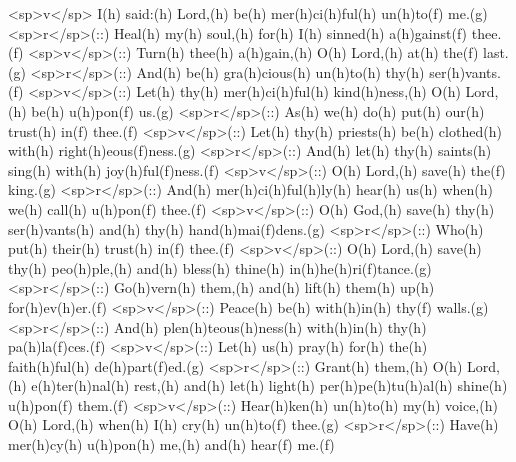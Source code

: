 <sp>v</sp> I(h) said:(h) Lord,(h) be(h) mer(h)ci(h)ful(h) un(h)to(f) me.(g)
<sp>r</sp>(::) Heal(h) my(h) soul,(h) for(h) I(h) sinned(h) a(h)gainst(f) thee.(f)
<sp>v</sp>(::) Turn(h) thee(h) a(h)gain,(h) O(h) Lord,(h) at(h) the(f) last.(g)
<sp>r</sp>(::) And(h) be(h) gra(h)cious(h) un(h)to(h) thy(h) ser(h)vants.(f)
<sp>v</sp>(::) Let(h) thy(h) mer(h)ci(h)ful(h) kind(h)ness,(h) O(h) Lord,(h) be(h) u(h)pon(f) us.(g)
<sp>r</sp>(::) As(h) we(h) do(h) put(h) our(h) trust(h) in(f) thee.(f)
<sp>v</sp>(::) Let(h) thy(h) priests(h) be(h) clothed(h) with(h) right(h)eous(f)ness.(g)
<sp>r</sp>(::) And(h) let(h) thy(h) saints(h) sing(h) with(h) joy(h)ful(f)ness.(f)
<sp>v</sp>(::) O(h) Lord,(h) save(h) the(f) king.(g)
<sp>r</sp>(::) And(h) mer(h)ci(h)ful(h)ly(h) hear(h) us(h) when(h) we(h) call(h) u(h)pon(f) thee.(f)
<sp>v</sp>(::) O(h) God,(h) save(h) thy(h) ser(h)vants(h) and(h) thy(h) hand(h)mai(f)dens.(g)
<sp>r</sp>(::) Who(h) put(h) their(h) trust(h) in(f) thee.(f)
<sp>v</sp>(::) O(h) Lord,(h) save(h) thy(h) peo(h)ple,(h) and(h) bless(h) thine(h) in(h)he(h)ri(f)tance.(g)
<sp>r</sp>(::) Go(h)vern(h) them,(h) and(h) lift(h) them(h) up(h) for(h)ev(h)er.(f)
<sp>v</sp>(::) Peace(h) be(h) with(h)in(h) thy(f) walls.(g)
<sp>r</sp>(::) And(h) plen(h)teous(h)ness(h) with(h)in(h) thy(h) pa(h)la(f)ces.(f)
<sp>v</sp>(::) Let(h) us(h) pray(h) for(h) the(h) faith(h)ful(h) de(h)part(f)ed.(g)
<sp>r</sp>(::) Grant(h) them,(h) O(h) Lord,(h) e(h)ter(h)nal(h) rest,(h) and(h) let(h) light(h) per(h)pe(h)tu(h)al(h) shine(h) u(h)pon(f) them.(f)
<sp>v</sp>(::) Hear(h)ken(h) un(h)to(h) my(h) voice,(h) O(h) Lord,(h) when(h) I(h) cry(h) un(h)to(f) thee.(g)
<sp>r</sp>(::) Have(h) mer(h)cy(h) u(h)pon(h) me,(h) and(h) hear(f) me.(f)